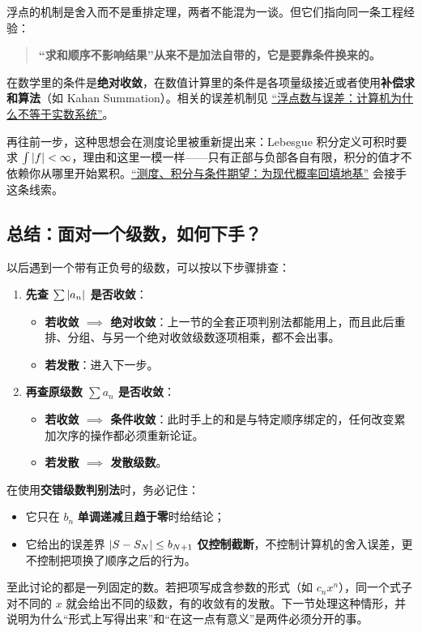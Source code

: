 浮点的机制是舍入而不是重排定理，两者不能混为一谈。但它们指向同一条工程经验：
\begin{quote}
\textbf{“求和顺序不影响结果”从来不是加法自带的，它是要靠条件换来的。}
\end{quote}
在数学里的条件是\textbf{绝对收敛}，在数值计算里的条件是各项量级接近或者使用\textbf{补偿求和算法}（如 Kahan Summation）。相关的误差机制见 \hyperref[ch:061]{``浮点数与误差：计算机为什么不等于实数系统''}。

再往前一步，这种思想会在测度论里被重新提出来：Lebesgue 积分定义可积时要求 \(\int\left|f\right|<\infty\)，理由和这里一模一样——只有正部与负部各自有限，积分的值才不依赖你从哪里开始累积。\hyperref[ch:101]{``测度、积分与条件期望：为现代概率回填地基''} 会接手这条线索。

\subsection{总结：面对一个级数，如何下手？}

以后遇到一个带有正负号的级数，可以按以下步骤排查：

\begin{enumerate}
    \item \textbf{先查 $\sum\left|a_n\right|$ 是否收敛}：
    \begin{itemize}
        \item \textbf{若收敛 $\implies$ 绝对收敛}：上一节的全套正项判别法都能用上，而且此后重排、分组、与另一个绝对收敛级数逐项相乘，都不会出事。
        \item \textbf{若发散}：进入下一步。
    \end{itemize}
    \item \textbf{再查原级数 $\sum a_n$ 是否收敛}：
    \begin{itemize}
        \item \textbf{若收敛 $\implies$ 条件收敛}：此时手上的和是与特定顺序绑定的，任何改变累加次序的操作都必须重新论证。
        \item \textbf{若发散 $\implies$ 发散级数}。
    \end{itemize}
\end{enumerate}

在使用\textbf{交错级数判别法}时，务必记住：
\begin{itemize}
    \item 它只在 $b_n$ \textbf{单调递减}且\textbf{趋于零}时给结论；
    \item 它给出的误差界 $\left|S-S_N\right|\le b_{N+1}$ \textbf{仅控制截断}，不控制计算机的舍入误差，更不控制把项换了顺序之后的行为。
\end{itemize}

至此讨论的都是一列固定的数。若把项写成含参数的形式（如 $c_nx^n$），同一个式子对不同的 $x$ 就会给出不同的级数，有的收敛有的发散。下一节处理这种情形，并说明为什么“形式上写得出来”和“在这一点有意义”是两件必须分开的事。